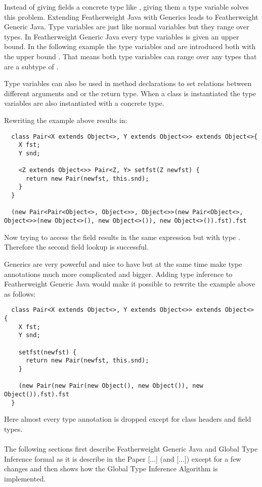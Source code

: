 Instead of giving fields a concrete type like , giving them a type variable solves this problem.
Extending Featherweight Java with Generics leads to Featherweight Generic Java.
Type variables are just like normal variables but they range over types. In Featherweight Generic Java every type variables is given an upper bound.
In the following example the type variables  and  are introduced both with the upper bound .
That means both type variables can range over any types that are a subtype of .

Type variables can also be used in method declarations to set relations between different arguments and or the return type.
When a class is instantiated the type variables are also instantiated with a concrete type.

Rewriting the example above results in:

\begin{verbatim}
  class Pair<X extends Object<>, Y extends Object<>> extends Object<>{
    X fst;
    Y snd;

    <Z extends Object<>> Pair<Z, Y> setfst(Z newfst) {
      return new Pair(newfst, this.snd);
    }
  }

  (new Pair<Pair<Object<>, Object<>>, Object<>>(new Pair<Object<>, Object<>>(new Object<>(), new Object<>()), new Object<>()).fst).fst
\end{verbatim}

Now trying to access the field  results in the same expression but with type . Therefore the second field lookup is successful.

Generics are very powerful and nice to have but at the same time make type annotations much more complicated and bigger.
Adding type inference to Featherweight Generic Java would make it possible to rewrite the example above as follows:

\begin{verbatim}
  class Pair<X extends Object<>, Y extends Object<>> extends Object<> {
    X fst;
    Y snd;

    setfst(newfst) {
      return new Pair(newfst, this.snd);
    }

    (new Pair(new Pair(new Object(), new Object()), new Object()).fst).fst
  }
\end{verbatim}

Here almost every type annotation is dropped except for class headers and field types.
\\
\\
The following sections first describe Featherweight Generic Java and Global Type Inference formal as it is describe in the Paper [...] (and [...]) except for a few changes and then shows how the Global Type Inference Algorithm is implemented.
